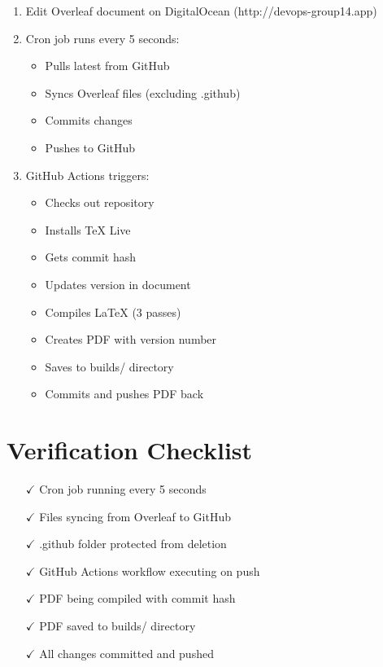 \begin{enumerate}
    \item Edit Overleaf document on DigitalOcean (http://devops-group14.app)
    \item Cron job runs every 5 seconds:
    \begin{itemize}
        \item Pulls latest from GitHub
        \item Syncs Overleaf files (excluding .github)
        \item Commits changes
        \item Pushes to GitHub
    \end{itemize}
    \item GitHub Actions triggers:
    \begin{itemize}
        \item Checks out repository
        \item Installs TeX Live
        \item Gets commit hash
        \item Updates version in document
        \item Compiles LaTeX (3 passes)
        \item Creates PDF with version number
        \item Saves to builds/ directory
        \item Commits and pushes PDF back
    \end{itemize}
\end{enumerate}

\section{Verification Checklist}

\begin{itemize}
    \item[$\checkmark$] Cron job running every 5 seconds
    \item[$\checkmark$] Files syncing from Overleaf to GitHub
    \item[$\checkmark$] .github folder protected from deletion
    \item[$\checkmark$] GitHub Actions workflow executing on push
    \item[$\checkmark$] PDF being compiled with commit hash
    \item[$\checkmark$] PDF saved to builds/ directory
    \item[$\checkmark$] All changes committed and pushed
\end{itemize}

